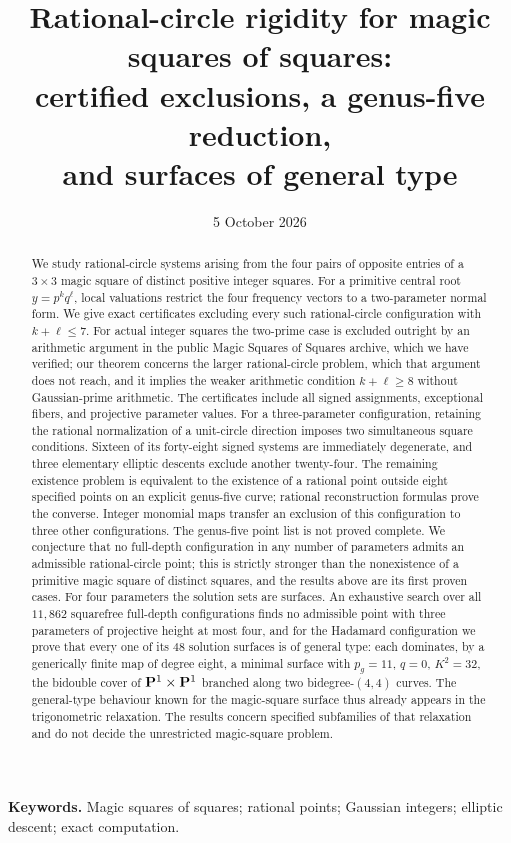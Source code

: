 \documentclass[11pt,letterpaper]{article}
\title{Rational-circle rigidity for magic squares of squares:\\certified exclusions, a genus-five reduction,\\and surfaces of general type}
\author{}
\date{5 October 2026}
\theoremstyle{definition}\newtheorem{definition}[theorem]{Definition}
\theoremstyle{remark}\newtheorem{remark}[theorem]{Remark}
\begin{document}
\maketitle
\begin{abstract}
We study rational-circle systems arising from the four pairs of opposite entries of a $3\times3$ magic square of distinct positive integer squares. For a primitive central root $y=p^kq^\ell$, local valuations restrict the four frequency vectors to a two-parameter normal form. We give exact certificates excluding every such rational-circle configuration with $k+\ell\le7$. For actual integer squares the two-prime case is excluded outright by an arithmetic argument in the public Magic Squares of Squares archive, which we have verified; our theorem concerns the larger rational-circle problem, which that argument does not reach, and it implies the weaker arithmetic condition $k+\ell\ge8$ without Gaussian-prime arithmetic. The certificates include all signed assignments, exceptional fibers, and projective parameter values. For a three-parameter configuration, retaining the rational normalization of a unit-circle direction imposes two simultaneous square conditions. Sixteen of its forty-eight signed systems are immediately degenerate, and three elementary elliptic descents exclude another twenty-four. The remaining existence problem is equivalent to the existence of a rational point outside eight specified points on an explicit genus-five curve; rational reconstruction formulas prove the converse. Integer monomial maps transfer an exclusion of this configuration to three other configurations. The genus-five point list is not proved complete. We conjecture that no full-depth configuration in any number of parameters admits an admissible rational-circle point; this is strictly stronger than the nonexistence of a primitive magic square of distinct squares, and the results above are its first proven cases. For four parameters the solution sets are surfaces. An exhaustive search over all $11{,}862$ squarefree full-depth configurations finds no admissible point with three parameters of projective height at most four, and for the Hadamard configuration we prove that every one of its $48$ solution surfaces is of general type: each dominates, by a generically finite map of degree eight, a minimal surface with $p_g=11$, $q=0$, $K^2=32$, the bidouble cover of $\mathbf P^1\times\mathbf P^1$ branched along two bidegree-$(4,4)$ curves. The general-type behaviour known for the magic-square surface thus already appears in the trigonometric relaxation. The results concern specified subfamilies of that relaxation and do not decide the unrestricted magic-square problem.
\end{abstract}
\medskip
\noindent\textbf{Keywords.} Magic squares of squares; rational points; Gaussian integers; elliptic descent; exact computation.
\end{document}

